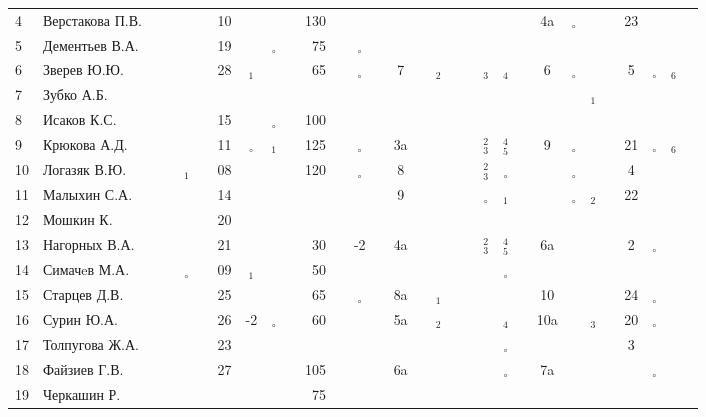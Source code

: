 \documentclass[a4paper,landscape,11pt]{article}
\newcommand*\OK{&\small \ding{51}$\!\!_\circ$} %
\newcommand*\Ok{&\small \ding{51}$\!\!_\circ$} %
\newcommand*\ok{&{\small\ding{51}}} %
\newcommand*\no{&{\small }} %
\newcommand*\da{&{\small\ding{48}$\!\!_1$}} %
\newcommand*\db{&{\small\ding{48}$\!\!_2$}} %
\newcommand*\bc{&{\small\ding{48}$\!\!^2_3$}} %
\newcommand*\dc{&{\small\ding{48}$\!\!_3$}} %
\newcommand*\dd{&{\small\ding{48}$\!\!_4$}} %
\newcommand*\De{&{\small\ding{48}$\!\!^4_5$}} %
\newcommand*\df{&{\small\ding{48}$\!\!_6$}} %
\begin{document}
\begin{tabular}{l|l|ccccccccrccccccccccccccccccc}
 4& Верстакова П.В.  \ok\ok\ok\ok&10\no\no\no&130\no\no\no \no\no\no\ok\ok\no\no\no& 4a\Ok\no\no&23\no\no\no\\
 5& Дементьев В.А.   \ok\ok\ok\ok&19\no\OK\ok& 75\no\Ok\ok \no\ok\no\no\ok\ok\no\no \no\ok\ok\ok\ok\no\ok\ok\\
 6& Зверев Ю.Ю.      \ok\ok\ok\ok&28\da\ok\ok& 65\ok\Ok\ok&  7\no\db\ok\ok\dc\dd\ok&  6\Ok\ok\ok& 5\Ok\df\ok\\
 7& Зубко А.Б.       \ok\no\ok\ok\no\no\ok\ok \no\no\no\no \no\no\no\no\no\no\no\no \no\no\da\ok\no\no\no\no\\ 
 8& Исаков К.С.      \ok\ok\ok\ok&15\no\OK\ok&100\no\ok\ok \no\no\no\no\ok\no\no\no \no\no\no\no\no\no\no\no\\
 9& Крюкова А.Д.     \ok\ok\ok\ok&11\OK\da\ok&125\ok\Ok\ok& 3a\ok\ok\ok\ok\bc\De\ok&  9\Ok\no\no&21\Ok\df\ok\\
10& Логазяк В.Ю.     \ok\ok\da\ok&08\no\ok\ok&120\ok\Ok\ok&  8\ok\ok\ok\ok\bc\Ok\ok \no\Ok\ok\ok& 4\no\ok\ok\\
\midrule
11& Малыхин С.А.     \ok\no\ok\ok&14\no\no\no \no\no\ok\ok&  9\no\no\no\ok\Ok\da\ok \no\Ok\db\ok&22\no\ok\ok\\
12& Мошкин К.        \ok\ok\ok\ok&20\ok\no\no \no\no\no\ok \no\no\no\no\no\no\no\no \no\no\no\no\no\no\no\no\\
13& Нагорных В.А.    \ok\ok\ok\ok&21\ok\ok\ok& 30\ok&-2\ok& 4a\ok\ok\ok\ok\bc\De\ok& 6a\no\ok\ok& 2\Ok\no\no\\
14& Симачeв М.А.     \ok\ok\OK\ok&09\da\no\no& 50\no\no\no \no\no\ok\ok\ok\no\Ok\ok \no\no\no\no\no\no\no\no\\
15& Старцев Д.В.     \ok\ok\ok\ok&25\ok\ok\ok& 65\ok\Ok\ok& 8a\ok\da\ok\ok\ok\ok\ok& 10\ok\ok\ok&24\Ok\ok\ok\\
16& Сурин Ю.А.       \ok\ok\ok\ok&26&-2\OK\ok& 60\ok\ok\ok& 5a\ok\db\ok\ok\no\dd\ok&10a\ok\dc\ok&20\Ok\ok\ok\\
17& Толпугова Ж.А.   \no\no\no\no&23\ok\no\no \no\no\no\no \no\no\ok\ok\no\ok\Ok\ok \no\no\no\no& 3\no\no\no\\
18& Файзиев Г.В.     \ok\ok\ok\ok&27\ok\ok\ok&105\ok\ok\ok& 6a\ok\no\ok\ok\ok\Ok\ok& 7a\ok\ok\ok\ok\Ok\ok\ok\\
19& Черкашин Р.      \ok\ok\ok\ok\no\no\no\no& 75\no\ok\ok \no\no\no\no\no\no\no\no \no\no\no\no\no\no\no\no\\ 
\bottomrule
\end{tabular} 
\end{document}
